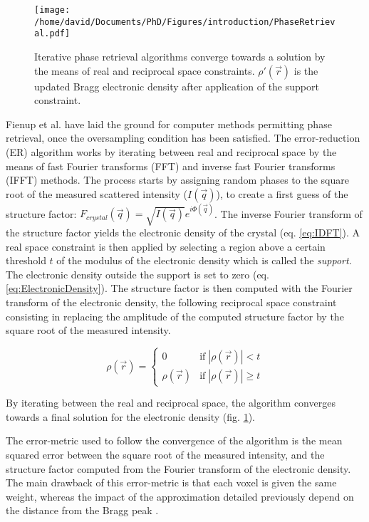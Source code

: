 \begin{figure}[!htb]
   \centering
   \texttt{[image: /home/david/Documents/PhD/Figures/introduction/PhaseRetrieval.pdf]}
   \caption{
   Iterative phase retrieval algorithms converge towards a solution by the means of real and reciprocal space constraints.
   $\rho'(\vec{r})$ is the updated Bragg electronic density after application of the support constraint.
   }
   \label{fig:PRAlgo}
\end{figure}

Fienup et al. \parencite*{Fienup1978, Fienup1982, Fienup1986} have laid the ground for computer methods permitting phase retrieval, once the oversampling condition has been satisfied.
The error-reduction (ER) algorithm works by iterating between real and reciprocal space by the means of fast Fourier transforms (FFT) and inverse fast Fourier transforms (IFFT) methods.
The process starts by assigning random phases to the square root of the measured scattered intensity ($I(\vec{q})$), to create a first guess of the structure factor: $F_{crystal}(\vec{q}) = \sqrt{I(\vec{q})}e^{i\Phi(\vec{q})}$.
The inverse Fourier transform of the structure factor yields the electronic density of the crystal (eq. \ref{eq:IDFT}).
A real space constraint is then applied by selecting a region above a certain threshold $t$ of the modulus of the electronic density which is called the \textit{support}.
The electronic density outside the support is set to zero (eq. \ref{eq:ElectronicDensity}).
The structure factor is then computed with the Fourier transform of the electronic density, the following reciprocal space constraint consisting in replacing the amplitude of the computed structure factor by the square root of the measured intensity.

\begin{equation}
    \label{eq:ElectronicDensity}
    \rho(\vec{r}) =
        \begin{cases}
            0  & \text{if} \; |\rho(\vec{r})| < t \\
            \rho(\vec{r}) & \text{if}  \; |\rho(\vec{r})| \geq t
        \end{cases}
\end{equation}

By iterating between the real and reciprocal space, the algorithm converges towards a final solution for the electronic density (fig. \ref{fig:PRAlgo}).

The error-metric used to follow the convergence of the algorithm is the mean squared error between the square root of the measured intensity, and the structure factor computed from the Fourier transform of the electronic density.
The main drawback of this error-metric is that each voxel is given the same weight, whereas the impact of the approximation detailed previously depend on the distance from the Bragg peak \parencite{Godard2021}.

